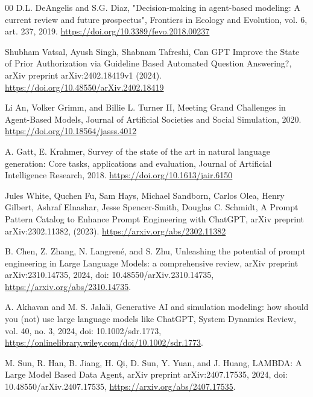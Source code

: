 \documentclass[preprint,12pt]{elsarticle}
\begin{document}
\begin{thebibliography}{00}
D.L. DeAngelis and S.G. Diaz,
"Decision-making in agent-based modeling: A current review and future prospectus",
Frontiers in Ecology and Evolution, vol. 6, art. 237, 2019.
\href{https://doi.org/10.3389/fevo.2018.00237}{https://doi.org/10.3389/fevo.2018.00237}


Shubham Vatsal, Ayush Singh, Shabnam Tafreshi,
Can GPT Improve the State of Prior Authorization via Guideline Based Automated Question Answering?,
arXiv preprint arXiv:2402.18419v1 (2024).
\href{https://doi.org/10.48550/arXiv.2402.18419}{https://doi.org/10.48550/arXiv.2402.18419}

Li An, Volker Grimm, and Billie L. Turner II,
Meeting Grand Challenges in Agent-Based Models,
Journal of Artificial Societies and Social Simulation, 2020.
\href{https://doi.org/10.18564/jasss.4012}{https://doi.org/10.18564/jasss.4012}

A. Gatt, E. Krahmer,
Survey of the state of the art in natural language generation: Core tasks, applications and evaluation,
Journal of Artificial Intelligence Research, 2018.
\href{https://doi.org/10.1613/jair.6150}{https://doi.org/10.1613/jair.6150}

Jules White, Quchen Fu, Sam Hays, Michael Sandborn, Carlos Olea, Henry Gilbert, Ashraf Elnashar, Jesse Spencer-Smith, Douglas C. Schmidt,
A Prompt Pattern Catalog to Enhance Prompt Engineering with ChatGPT,
arXiv preprint arXiv:2302.11382, (2023).
\href{https://arxiv.org/abs/2302.11382}{https://arxiv.org/abs/2302.11382}

B. Chen, Z. Zhang, N. Langrené, and S. Zhu,
Unleashing the potential of prompt engineering in Large Language Models: a comprehensive review,
arXiv preprint arXiv:2310.14735, 2024,
doi: 10.48550/arXiv.2310.14735,
\href{https://arxiv.org/abs/2310.14735}{https://arxiv.org/abs/2310.14735}.

A. Akhavan and M. S. Jalali,
Generative AI and simulation modeling: how should you (not) use large language models like ChatGPT,
System Dynamics Review, vol. 40, no. 3, 2024,
doi: 10.1002/sdr.1773,
\href{https://onlinelibrary.wiley.com/doi/10.1002/sdr.1773}{https://onlinelibrary.wiley.com/doi/10.1002/sdr.1773}.


M. Sun, R. Han, B. Jiang, H. Qi, D. Sun, Y. Yuan, and J. Huang,
LAMBDA: A Large Model Based Data Agent,
arXiv preprint arXiv:2407.17535, 2024,
doi: 10.48550/arXiv.2407.17535,
\href{https://arxiv.org/abs/2407.17535}{https://arxiv.org/abs/2407.17535}.


\end{thebibliography}
\end{document}
